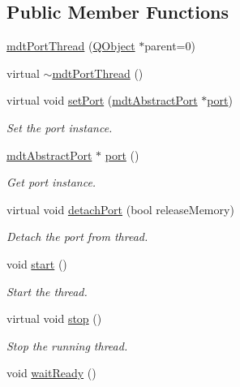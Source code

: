 \subsection*{Public Member Functions}
\begin{DoxyCompactItemize}
\item 
\hyperlink{classmdt_port_thread_aa20869c68d7a016f9e547464f0d8b71e}{mdt\-Port\-Thread} (\hyperlink{class_q_object}{Q\-Object} $\ast$parent=0)
\item 
virtual \hyperlink{classmdt_port_thread_a554615870b4c3b18af73d2ab7262800d}{$\sim$mdt\-Port\-Thread} ()
\item 
virtual void \hyperlink{classmdt_port_thread_acd51474c3a2683676423317bc9cb31b2}{set\-Port} (\hyperlink{classmdt_abstract_port}{mdt\-Abstract\-Port} $\ast$\hyperlink{classmdt_port_thread_a97bff8cf6aca37d8858cc4e5c9294cae}{port})
\begin{DoxyCompactList}\small\item\em Set the port instance. \end{DoxyCompactList}\item 
\hyperlink{classmdt_abstract_port}{mdt\-Abstract\-Port} $\ast$ \hyperlink{classmdt_port_thread_a97bff8cf6aca37d8858cc4e5c9294cae}{port} ()
\begin{DoxyCompactList}\small\item\em Get port instance. \end{DoxyCompactList}\item 
virtual void \hyperlink{classmdt_port_thread_a29b434534a5564efbd9dfe570a61b143}{detach\-Port} (bool release\-Memory)
\begin{DoxyCompactList}\small\item\em Detach the port from thread. \end{DoxyCompactList}\item 
void \hyperlink{classmdt_port_thread_a5a5c1290eaa43182d69c3f39eadbec00}{start} ()
\begin{DoxyCompactList}\small\item\em Start the thread. \end{DoxyCompactList}\item 
virtual void \hyperlink{classmdt_port_thread_a5746ea96689ed80179751ad1353f0b39}{stop} ()
\begin{DoxyCompactList}\small\item\em Stop the running thread. \end{DoxyCompactList}\item 
void \hyperlink{classmdt_port_thread_aca7473f73c6b68fe8c3e1cfc349240e7}{wait\-Ready} ()

\end{DoxyCompactItemize}

